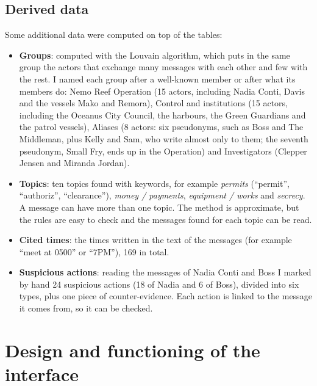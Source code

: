 \documentclass[11pt,a4paper]{article}
\begin{document}
\subsection{Derived data}
Some additional data were computed on top of the tables:
\begin{itemize}
  \item \textbf{Groups}: computed with the Louvain algorithm, which puts in the same group the actors that exchange
        many messages with each other and few with the rest. I named each group after a well-known member or after
        what its members do: Nemo Reef
        Operation (15 actors, including Nadia Conti, Davis and the vessels Mako and Remora), Control and institutions
        (15 actors, including the Oceanus City Council, the harbours, the Green Guardians and the patrol vessels),
        Aliases (8 actors: six pseudonyms, such as Boss and The Middleman, plus Kelly and Sam, who
        write almost only to them; the seventh pseudonym, Small Fry, ends up in the Operation) and Investigators (Clepper Jensen and Miranda Jordan).
  \item \textbf{Topics}: ten topics found with keywords, for example \emph{permits} (``permit'', ``authoriz'',
        ``clearance''), \emph{money / payments}, \emph{equipment / works} and \emph{secrecy}. A message can have more
        than one topic. The method is approximate, but the rules are easy to check and the messages found for each
        topic can be read.
  \item \textbf{Cited times}: the times written in the text of the messages (for example ``meet at 0500'' or
        ``7PM''), 169 in total.
  \item \textbf{Suspicious actions}: reading the messages of Nadia Conti and Boss I marked by hand 24 suspicious
        actions (18 of Nadia and 6 of Boss), divided into six types, plus one piece of counter-evidence. Each action is linked to the message it comes from, so it can be checked.
\end{itemize}

\section{Design and functioning of the interface}
\end{document}

